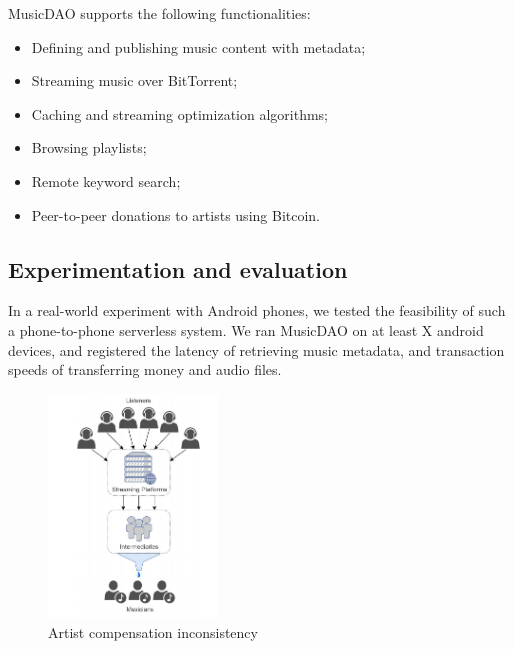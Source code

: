 MusicDAO supports the following functionalities:
\begin{itemize}
    \item Defining and publishing music content with metadata;
    \item Streaming music over BitTorrent;
    \item Caching and streaming optimization algorithms;
    \item Browsing playlists;
    \item Remote keyword search;
    \item Peer-to-peer donations to artists using Bitcoin.
\end{itemize}

\subsection{Experimentation and evaluation}
In a real-world experiment with Android phones, we tested the feasibility of such a phone-to-phone serverless system. We ran MusicDAO on at least X android devices, and registered the latency of retrieving music metadata, and transaction speeds of transferring money and audio files. 

\begin{figure}
	\includegraphics[width=0.4\textwidth]{introduction/problem-image.png}
	\caption{Artist compensation inconsistency}
\end{figure}


